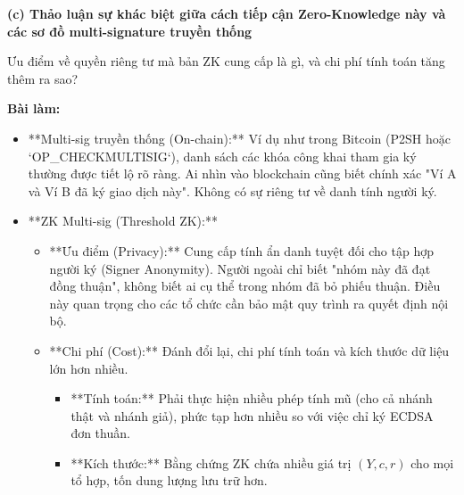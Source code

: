 \textbf{(c) Thảo luận sự khác biệt giữa cách tiếp cận Zero-Knowledge này và các sơ đồ multi-signature truyền thống}

Ưu điểm về quyền riêng tư mà bản ZK cung cấp là gì, và chi phí tính toán tăng thêm ra sao?

\textbf{Bài làm:}

\begin{itemize}
    \item **Multi-sig truyền thống (On-chain):** Ví dụ như trong Bitcoin (P2SH hoặc `OP\_CHECKMULTISIG`), danh sách các khóa công khai tham gia ký thường được tiết lộ rõ ràng. Ai nhìn vào blockchain cũng biết chính xác "Ví A và Ví B đã ký giao dịch này". Không có sự riêng tư về danh tính người ký.
    
    \item **ZK Multi-sig (Threshold ZK):**
        \begin{itemize}
            \item **Ưu điểm (Privacy):** Cung cấp tính ẩn danh tuyệt đối cho tập hợp người ký (Signer Anonymity). Người ngoài chỉ biết "nhóm này đã đạt đồng thuận", không biết ai cụ thể trong nhóm đã bỏ phiếu thuận. Điều này quan trọng cho các tổ chức cần bảo mật quy trình ra quyết định nội bộ.
            \item **Chi phí (Cost):** Đánh đổi lại, chi phí tính toán và kích thước dữ liệu lớn hơn nhiều.
            \begin{itemize}
                \item **Tính toán:** Phải thực hiện nhiều phép tính mũ (cho cả nhánh thật và nhánh giả), phức tạp hơn nhiều so với việc chỉ ký ECDSA đơn thuần.
                \item **Kích thước:** Bằng chứng ZK chứa nhiều giá trị $(Y, c, r)$ cho mọi tổ hợp, tốn dung lượng lưu trữ hơn.
            \end{itemize}
        \end{itemize}
\end{itemize}
